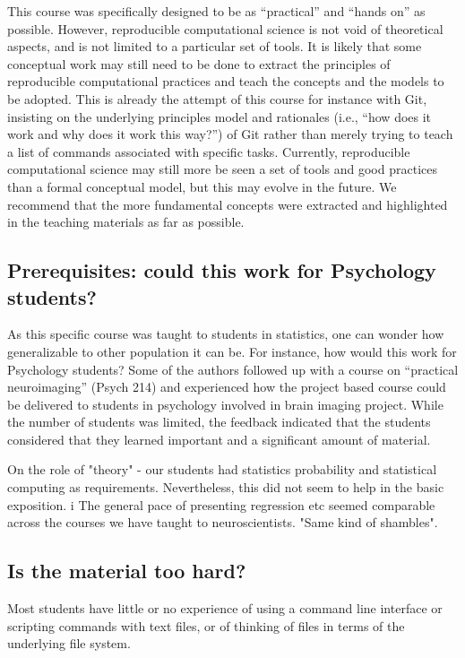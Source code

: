 This course was specifically designed to be as ``practical'' and ``hands on''
as possible.
However, reproducible computational science is not void of theoretical aspects,
and is not limited to a particular set of tools.
It is likely that some conceptual work may still need to be done to extract the
principles of reproducible computational practices and teach the concepts and
the models to be adopted.
This is already the attempt of this course for instance with Git, insisting on
the underlying principles model and rationales (i.e., ``how does it work and
why does it work this way?'') of Git rather than merely trying to teach a list
of commands associated with specific tasks. 
Currently, reproducible computational science may still more be seen a set of
tools and good practices than a formal conceptual model, but this may evolve in
the future.
We recommend that the more fundamental concepts were extracted and highlighted
in the teaching materials as far as possible.

\subsection{Prerequisites: could this work for Psychology students?}

As this specific course was taught to students in statistics, one can wonder
how generalizable to other population it can be.
For instance, how would this work for Psychology students?
Some of the authors followed up with a course on ``practical neuroimaging''
(Psych 214) and experienced how the project based course could be delivered to
students in psychology involved in brain imaging project.
While the number of students was limited, the feedback indicated that the
students considered that they learned important and a significant amount of
material.

On the role of "theory" - our students had statistics probability and
statistical computing as requirements.
Nevertheless, this did not seem to help in the basic exposition.  i
The general pace of presenting regression etc seemed comparable across the
courses we have taught to neuroscientists.
"Same kind of shambles".

\subsection{Is the material too hard?}

Most students have little or no experience of using a command line interface
or scripting commands with text files, or of thinking of files in terms of the
underlying file system.


